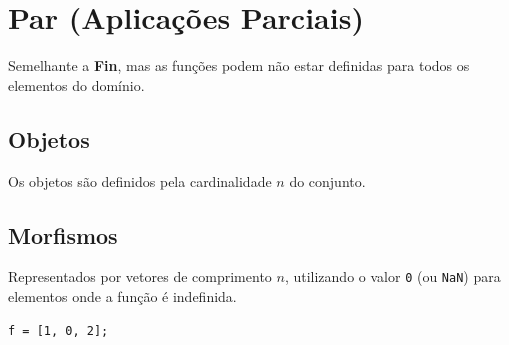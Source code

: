 \section{Par (Aplicações Parciais)}

Semelhante a \textbf{Fin}, mas as funções podem não estar definidas para todos os elementos do domínio.

\subsection{Objetos}
Os objetos são definidos pela cardinalidade $n$ do conjunto.

\subsection{Morfismos}
Representados por vetores de comprimento $n$, utilizando o valor \texttt{0} (ou \texttt{NaN}) para elementos onde a função é indefinida.

\begin{lstlisting}[caption={Morfismo Parcial}]
% O valor 0 indica que o elemento não tem imagem
f = [1, 0, 2]; 
\end{lstlisting}